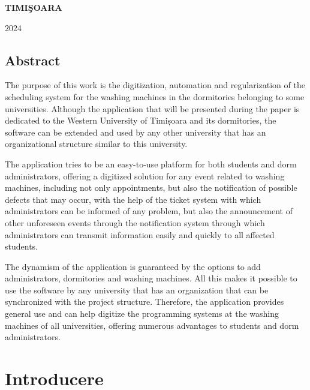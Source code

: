 \documentclass[12pt,a4paper]{report}
\theoremstyle{definition}
\theoremstyle{remark}
\begin{document}
\vfill
\begin{center}
    {\bf TIMI\c SOARA

        2024}
\end{center}
\newpage
\normalsize{}
\section*{Abstract}

\par The purpose of this work is the digitization, automation and regularization of the scheduling system for the washing machines in the dormitories belonging to some universities. Although the application that will be presented during the paper is dedicated to the Western University of Timișoara and its dormitories, the software can be extended and used by any other university that has an organizational structure similar to this university.
\vspace{1em}

\par The application tries to be an easy-to-use platform for both students and dorm administrators, offering a digitized solution for any event related to washing machines, including not only appointments, but also the notification of possible defects that may occur, with the help of the ticket system with which administrators can be informed of any problem, but also the announcement of other unforeseen events through the notification system through which administrators can transmit information easily and quickly to all affected students.
\vspace{1em}

\par The dynamism of the application is guaranteed by the options to add administrators, dormitories and washing machines. All this makes it possible to use the software by any university that has an organization that can be synchronized with the project structure. Therefore, the application provides general use and can help digitize the programming systems at the washing machines of all universities, offering numerous advantages to students and dorm administrators.
\vspace{1em}

\tableofcontents
\newpage

\chapter{Introducere}
\end{document}
